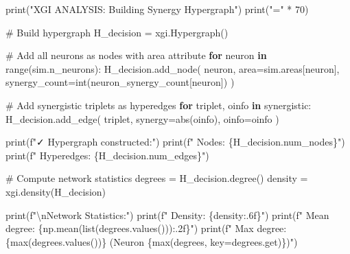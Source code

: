 \documentclass[
  11pt,
  letterpaper,
  oneside,
  openany]{book}
\newenvironment{Shaded}{\begin{snugshade}}{\end{snugshade}}
\newcommand{\BuiltInTok}[1]{\textcolor[rgb]{0.00,0.23,0.31}{#1}}
\newcommand{\CharTok}[1]{\textcolor[rgb]{0.13,0.47,0.30}{#1}}
\newcommand{\CommentTok}[1]{\textcolor[rgb]{0.37,0.37,0.37}{#1}}
\newcommand{\ControlFlowTok}[1]{\textcolor[rgb]{0.00,0.23,0.31}{\textbf{#1}}}
\newcommand{\DecValTok}[1]{\textcolor[rgb]{0.68,0.00,0.00}{#1}}
\newcommand{\KeywordTok}[1]{\textcolor[rgb]{0.00,0.23,0.31}{\textbf{#1}}}
\newcommand{\NormalTok}[1]{\textcolor[rgb]{0.00,0.23,0.31}{#1}}
\newcommand{\OperatorTok}[1]{\textcolor[rgb]{0.37,0.37,0.37}{#1}}
\newcommand{\SpecialCharTok}[1]{\textcolor[rgb]{0.37,0.37,0.37}{#1}}
\newcommand{\SpecialStringTok}[1]{\textcolor[rgb]{0.13,0.47,0.30}{#1}}
\newcommand{\StringTok}[1]{\textcolor[rgb]{0.13,0.47,0.30}{#1}}
\begin{document}
\begin{Shaded}
\begin{Highlighting}[]
\BuiltInTok{print}\NormalTok{(}\StringTok{"XGI ANALYSIS: Building Synergy Hypergraph"}\NormalTok{)}
\BuiltInTok{print}\NormalTok{(}\StringTok{"="} \OperatorTok{*} \DecValTok{70}\NormalTok{)}

\CommentTok{\# Build hypergraph}
\NormalTok{H\_decision }\OperatorTok{=}\NormalTok{ xgi.Hypergraph()}

\CommentTok{\# Add all neurons as nodes with area attribute}
\ControlFlowTok{for}\NormalTok{ neuron }\KeywordTok{in} \BuiltInTok{range}\NormalTok{(sim.n\_neurons):}
\NormalTok{    H\_decision.add\_node(}
\NormalTok{        neuron,}
\NormalTok{        area}\OperatorTok{=}\NormalTok{sim.areas[neuron],}
\NormalTok{        synergy\_count}\OperatorTok{=}\BuiltInTok{int}\NormalTok{(neuron\_synergy\_count[neuron])}
\NormalTok{    )}

\CommentTok{\# Add synergistic triplets as hyperedges}
\ControlFlowTok{for}\NormalTok{ triplet, oinfo }\KeywordTok{in}\NormalTok{ synergistic:}
\NormalTok{    H\_decision.add\_edge(}
\NormalTok{        triplet,}
\NormalTok{        synergy}\OperatorTok{=}\BuiltInTok{abs}\NormalTok{(oinfo),}
\NormalTok{        oinfo}\OperatorTok{=}\NormalTok{oinfo}
\NormalTok{    )}

\BuiltInTok{print}\NormalTok{(}\SpecialStringTok{f"✓ Hypergraph constructed:"}\NormalTok{)}
\BuiltInTok{print}\NormalTok{(}\SpecialStringTok{f"  Nodes: }\SpecialCharTok{\{}\NormalTok{H\_decision}\SpecialCharTok{.}\NormalTok{num\_nodes}\SpecialCharTok{\}}\SpecialStringTok{"}\NormalTok{)}
\BuiltInTok{print}\NormalTok{(}\SpecialStringTok{f"  Hyperedges: }\SpecialCharTok{\{}\NormalTok{H\_decision}\SpecialCharTok{.}\NormalTok{num\_edges}\SpecialCharTok{\}}\SpecialStringTok{"}\NormalTok{)}

\CommentTok{\# Compute network statistics}
\NormalTok{degrees }\OperatorTok{=}\NormalTok{ H\_decision.degree()}
\NormalTok{density }\OperatorTok{=}\NormalTok{ xgi.density(H\_decision)}

\BuiltInTok{print}\NormalTok{(}\SpecialStringTok{f"}\CharTok{\textbackslash{}n}\SpecialStringTok{Network Statistics:"}\NormalTok{)}
\BuiltInTok{print}\NormalTok{(}\SpecialStringTok{f"  Density: }\SpecialCharTok{\{}\NormalTok{density}\SpecialCharTok{:.6f\}}\SpecialStringTok{"}\NormalTok{)}
\BuiltInTok{print}\NormalTok{(}\SpecialStringTok{f"  Mean degree: }\SpecialCharTok{\{}\NormalTok{np}\SpecialCharTok{.}\NormalTok{mean(}\BuiltInTok{list}\NormalTok{(degrees.values()))}\SpecialCharTok{:.2f\}}\SpecialStringTok{"}\NormalTok{)}
\BuiltInTok{print}\NormalTok{(}\SpecialStringTok{f"  Max degree: }\SpecialCharTok{\{}\BuiltInTok{max}\NormalTok{(degrees.values())}\SpecialCharTok{\}}\SpecialStringTok{ (Neuron }\SpecialCharTok{\{}\BuiltInTok{max}\NormalTok{(degrees, key}\OperatorTok{=}\NormalTok{degrees.get)}\SpecialCharTok{\}}\SpecialStringTok{)"}\NormalTok{)}


\end{Highlighting}
\end{Shaded}
\end{document}
